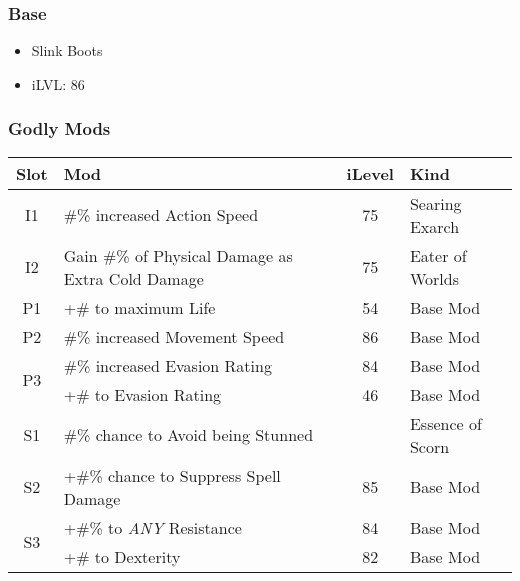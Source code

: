 \subsubsection{Base}
\begin{itemize}
	\item Slink Boots
	\item iLVL: 86
\end{itemize}

\subsubsection{Godly Mods}
\begin{tabular}{|c|l|c|l|}
	\hline
	Slot&Mod&iLevel&Kind\\\hline
	I1& \#\% increased Action Speed&75& Searing Exarch \\\hline
	I2& Gain \#\% of Physical Damage as Extra Cold Damage&75& Eater of Worlds \\\hline\hline
	P1& +\# to maximum Life&54& Base Mod \\\hline
	P2& \#\% increased Movement Speed&86& Base Mod \\\hline
	\multirow{2}{*}{P3}& \#\% increased Evasion Rating&84& Base Mod \\\cline{2-4}
	& +\# to Evasion Rating&46& Base Mod \\\hline\hline
	S1&\#\% chance to Avoid being Stunned&&Essence of Scorn \\\hline
	S2&+\#\% chance to Suppress Spell Damage&85&Base Mod \\\hline
	\multirow{2}{*}{S3}&+\#\% to \emph{ANY} Resistance&84&Base Mod \\\cline{2-4}
	&+\# to Dexterity&82&Base Mod \\\hline
\end{tabular}


